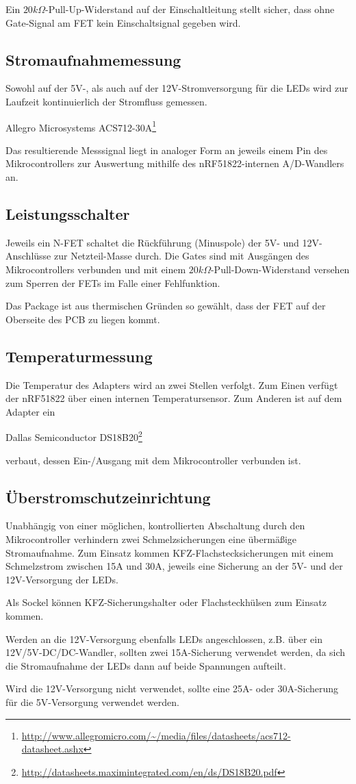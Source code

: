 Ein $20k\Omega$-Pull-Up-Widerstand auf der Einschaltleitung
stellt sicher, dass ohne Gate-Signal am FET
kein Einschaltsignal gegeben wird.

\subsection{Stromaufnahmemessung}
Sowohl auf der 5V-,
als auch auf der 12V-Stromversorgung
f\"ur die LEDs
wird zur Laufzeit kontinuierlich
der Stromfluss gemessen.

\begin{center}
Allegro Microsystems ACS712-30A\footnote{\url{http://www.allegromicro.com/~/media/files/datasheets/acs712-datasheet.ashx}}
\end{center}
Das resultierende Messsignal liegt
in analoger Form
an jeweils einem Pin des Mikrocontrollers
zur Auswertung
mithilfe des nRF51822-internen A/D-Wandlers
an.

\subsection{Leistungsschalter}
Jeweils ein N-FET schaltet die R\"uckf\"uhrung (Minuspole)
der 5V- und 12V-Anschl\"usse zur Netzteil-Masse durch.
Die Gates sind mit Ausg\"angen des Mikrocontrollers verbunden
und mit einem $20k\Omega$-Pull-Down-Widerstand versehen
zum Sperren der FETs
im Falle einer Fehlfunktion.

Das Package ist
aus thermischen Gr\"unden
so gew\"ahlt,
dass der FET auf der Oberseite des PCB
zu liegen kommt.

\subsection{Temperaturmessung}
Die Temperatur des Adapters wird an zwei Stellen verfolgt.
Zum Einen verf\"ugt der nRF51822 \"uber einen internen Temperatursensor.
Zum Anderen ist auf dem Adapter ein
\begin{center}
	Dallas Semiconductor DS18B20\footnote{\url{http://datasheets.maximintegrated.com/en/ds/DS18B20.pdf}}
\end{center}
verbaut,
dessen Ein-/Ausgang
mit dem Mikrocontroller verbunden ist.

\subsection{\"Uberstromschutzeinrichtung}
Unabh\"angig von einer m\"oglichen, kontrollierten Abschaltung durch den Mikrocontroller
verhindern zwei Schmelzsicherungen eine \"uberm\"a{\ss}ige Stromaufnahme.
Zum Einsatz kommen KFZ-Flachstecksicherungen mit einem Schmelzstrom zwischen 15A und 30A,
jeweils eine Sicherung an der 5V- und der 12V-Versorgung der LEDs.

Als Sockel k\"onnen KFZ-Sicherungshalter oder Flachsteckh\"ulsen zum Einsatz kommen.

Werden an die 12V-Versorgung ebenfalls LEDs angeschlossen,
z.B. \"uber ein 12V/5V-DC/DC-Wandler,
sollten zwei 15A-Sicherung verwendet werden,
da sich die Stromaufnahme der LEDs
dann auf beide Spannungen aufteilt.

Wird die 12V-Versorgung nicht verwendet,
sollte eine 25A- oder 30A-Sicherung
f\"ur die 5V-Versorgung verwendet werden.
